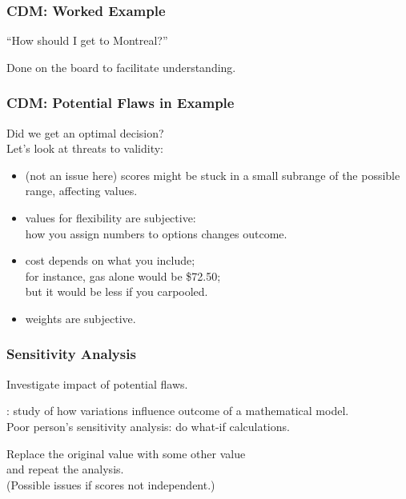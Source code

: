 \begin{frame}
\frametitle{CDM: Worked Example}

\begin{changemargin}{1cm}
``How should I get to Montreal?''

Done on the board to facilitate understanding.

\end{changemargin}

\end{frame}

\begin{frame}
\frametitle{CDM: Potential Flaws in Example}

\begin{changemargin}{1cm}

Did we get an optimal decision? \\

Let's look at threats to validity:

\begin{itemize}
\item (not an issue here) scores might be stuck in a
small subrange of the possible range, affecting values.
\item values for flexibility are subjective:\\
how you assign numbers to options changes  outcome.
\item cost depends on what you include; \\
for instance, gas alone would be \$72.50; \\
but it would be less if you carpooled.
\item weights are subjective.
\end{itemize}

\end{changemargin}

\end{frame}

\begin{frame}
\frametitle{Sensitivity Analysis}

\begin{changemargin}{1cm}
Investigate impact of potential flaws.

: study of how variations
influence outcome of a mathematical model.\\[1.5em]

Poor person's sensitivity analysis: do what-if
calculations.

Replace the original value with some other value\\
and repeat the analysis. \\

(Possible issues if scores not independent.)

\end{changemargin}

\end{frame}

